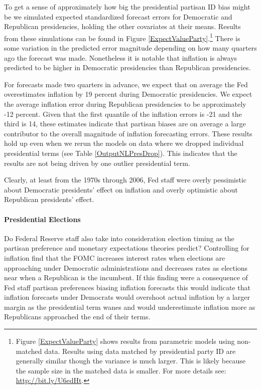 \documentclass[a4paper]{article}\usepackage{graphicx, color}
\begin{document}
To get a sense of approximately how big the presidential partisan ID bias might be we simulated expected standardized forecast errors for Democratic and Republican presidencies, holding the other covariates at their means. Results from these simulations can be found in Figure \ref{ExpectValueParty}.\footnote{Figure \ref{ExpectValueParty} shows results from parametric models using non-matched data. Results using data matched by presidential party ID are generally similar though the variance is much larger. This is likely because the sample size in the matched data is smaller. For more details see: \url{http://bit.ly/U6edHt}.} There is some variation in the predicted error magnitude depending on how many quarters ago the forecast was made. Nonetheless it is notable that inflation is always predicted to be higher in Democratic presidencies than Republican presidencies.

For forecasts made two quarters in advance, we expect that on average the Fed overestimates inflation by 19 percent during Democratic presidencies. We expect the average inflation error during Republican presidencies to be approximately -12 percent. Given that the first quantile of the inflation errors is -21 and the third is 14, these estimates indicate that partisan biases are on average a large contributor to the overall magnitude of inflation forecasting errors. These results hold up even when we rerun the models on data where we dropped individual presidential terms (see Table \ref{OutputNLPresDrop}). This indicates that the results are not being driven by one outlier presidential term.

Clearly, at least from the 1970s through 2006, Fed staff were overly pessimistic about Democratic presidents' effect on inflation and overly optimistic about Republican presidents' effect. 

\paragraph{Presidential Elections}

Do Federal Reserve staff also take into consideration election timing as the partisan preference and monetary expectations theories predict?  Controlling for inflation \cite{Clark2012} find that the FOMC increases interest rates when elections are approaching under Democratic administrations and decreases rates as elections near when a Republican is the incumbent. If this finding were a consequence of Fed staff partisan preferences biasing inflation forecasts this would indicate that inflation forecasts under Democrats would overshoot actual inflation by a larger margin as the presidential term wanes and would underestimate inflation more as Republicans approached the end of their terms.  
\end{document}
